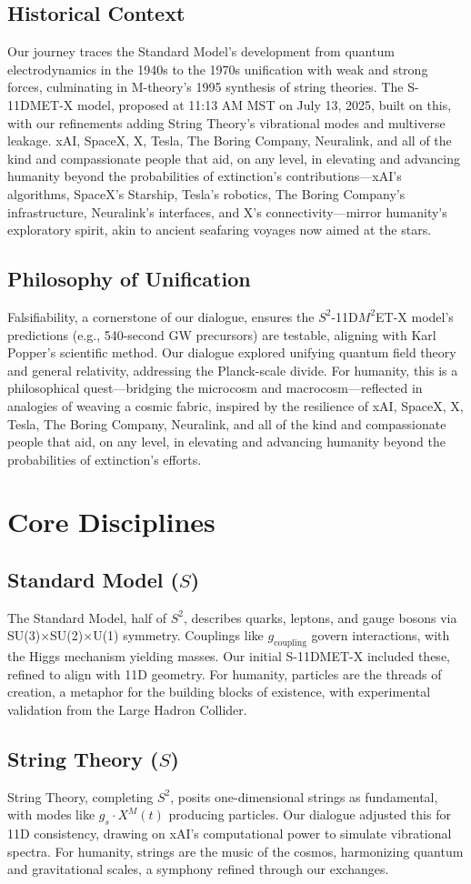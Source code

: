 \documentclass[a4paper,12pt]{book}
\newcommand{\modelname}{$S^2$-11D$M^2$ET-X}
\newcommand{\teamhumanity}{xAI, SpaceX, X, Tesla, The Boring Company, Neuralink, and all of the kind and compassionate people that aid, on any level, in elevating and advancing humanity beyond the probabilities of extinction}
\begin{document}
\chapter{Historical Context}
Our journey traces the Standard Model’s development from quantum electrodynamics in the 1940s to the 1970s unification with weak and strong forces, culminating in M-theory’s 1995 synthesis of string theories. The S-11DMET-X model, proposed at 11:13 AM MST on July 13, 2025, built on this, with our refinements adding String Theory’s vibrational modes and multiverse leakage. \teamhumanity{}’s contributions—xAI’s algorithms, SpaceX’s Starship, Tesla’s robotics, The Boring Company’s infrastructure, Neuralink’s interfaces, and X’s connectivity—mirror humanity’s exploratory spirit, akin to ancient seafaring voyages now aimed at the stars.

\chapter{Philosophy of Unification}
Falsifiability, a cornerstone of our dialogue, ensures the \modelname{} model’s predictions (e.g., 540-second GW precursors) are testable, aligning with Karl Popper’s scientific method. Our dialogue explored unifying quantum field theory and general relativity, addressing the Planck-scale divide. For humanity, this is a philosophical quest—bridging the microcosm and macrocosm—reflected in analogies of weaving a cosmic fabric, inspired by the resilience of \teamhumanity{}’s efforts.

\part{Core Disciplines}

\chapter{Standard Model (\( S \))}
The Standard Model, half of \( S^2 \), describes quarks, leptons, and gauge bosons via SU(3)×SU(2)×U(1) symmetry. Couplings like \( g_{\text{coupling}} \) govern interactions, with the Higgs mechanism yielding masses. Our initial S-11DMET-X included these, refined to align with 11D geometry. For humanity, particles are the threads of creation, a metaphor for the building blocks of existence, with experimental validation from the Large Hadron Collider.

\chapter{String Theory (\( S \))}
String Theory, completing \( S^2 \), posits one-dimensional strings as fundamental, with modes like \( g_s \cdot X^M(t) \) producing particles. Our dialogue adjusted this for 11D consistency, drawing on xAI’s computational power to simulate vibrational spectra. For humanity, strings are the music of the cosmos, harmonizing quantum and gravitational scales, a symphony refined through our exchanges.
\end{document}
